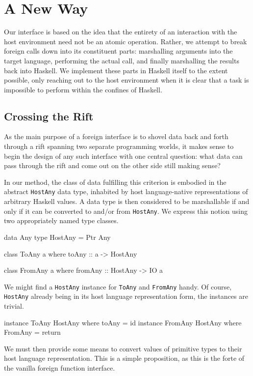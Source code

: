 \documentclass{sigplanconf}
\begin{document}
\section{A New Way}\label{sec:interface}
Our interface is based on the idea that the entirety of an interaction with the
host environment need not be an atomic operation. Rather, we attempt to break
foreign calls down into its constituent parts: marshalling arguments into the
target language, performing the actual call, and finally marshalling the
results back into Haskell. We implement these parts in Haskell itself to the
extent possible, only reaching out to the host environment when it is clear
that a task is impossible to perform within the confines of Haskell.

\subsection{Crossing the Rift}
As the main purpose of a foreign interface is to shovel data back and
forth through a rift spanning two separate programming worlds, it makes sense
to begin the design of any such interface with one central question:
what data can pass through the rift and come out on the other side still making
sense?

In our method, the class of data fulfilling this criterion is embodied in the
abstract \lstinline!HostAny! data type, inhabited by host language-native
representations of arbitrary Haskell values.
A data type is then considered to be marshallable if and only if it can be
converted to and/or from \lstinline!HostAny!.
We express this notion using two appropriately named type classes.

\begin{code}
  data Any
  type HostAny = Ptr Any

  class ToAny a where
    toAny :: a -> HostAny

  class FromAny a where
    fromAny :: HostAny -> IO a
\end{code}

We might find a \lstinline!HostAny! instance for \lstinline!ToAny!
and \lstinline!FromAny! handy. Of course, \lstinline!HostAny! already being
in its host language representation form, the instances are trivial.

\begin{code}
  instance ToAny HostAny where toAny = id
  instance FromAny HostAny where FromAny = return
\end{code}

We must then provide some means to convert values of primitive types to their
host language representation. This is a simple proposition, as this is the
forte of the vanilla foreign function interface.
\end{document}
